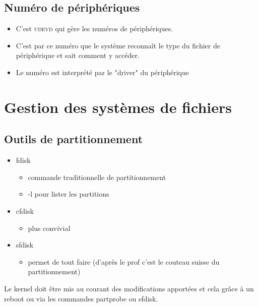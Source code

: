 \documentclass[a4paper]{article}
\begin{document}
\begin{center}
      \end{center}

      \subsection{Numéro de périphériques}
      \begin{itemize}[label=\textbullet, font=\Large]
        \item C'est \textsc{udevd} qui gère les numéros de périphériques.
        \item C'est par ce numéro que le système reconnaît le type du fichier de périphérique et sait comment y accéder.
        \item Le numéro est interprété par le "driver" du périphérique
      \end{itemize}

      \section{Gestion des systèmes de fichiers}
      \subsection{Outils de partitionnement}
      \begin{itemize}[label=\textbullet, font=\Large]
        \item fdisk
        \begin{itemize}[label=, font=\scriptsize]
          \item commande traditionnelle de partitionnement
          \item -l pour lister les partitions
        \end{itemize}
        \item cfdisk
        \begin{itemize}[label=, font=\scriptsize]
          \item plus convivial
        \end{itemize}
        \item sfdisk
        \begin{itemize}[label=, font=\scriptsize]
          \item permet de tout faire (d'après le prof c'est le couteau suisse du partitionnement)
        \end{itemize}
      \end{itemize}
      Le kernel doit être mis au courant des modifications apportées et cela grâce à un reboot ou via les commandes partprobe ou sfdisk.
\end{document}
